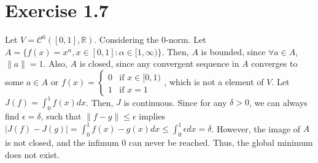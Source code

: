 \documentclass[11pt]{report}
\begin{document}
\section*{Exercise 1.7}
Let $V = \mathcal{C}^0([0,1],\mathbb{R})$. Considering the $0$-norm. Let $A = \{f(x) = x^\alpha, x \in [0,1]: \alpha \in [1, \infty)\}$. Then, $A$ is bounded, since $\forall a \in A$, $\|a\| = 1$. Also, $A$ is closed, since any convergent sequence in $A$ converges to some $a \in A$ or $f(x) = \begin{cases}0 &\mbox{if } x \in [0,1)\\ 1 &\mbox{if } x = 1\end{cases}$, which is not a element of $V$. Let $J(f) = \int_{0}^{1} f(x)dx$. Then, $J$ is continuous. Since for any $\delta > 0$, we can always find $\epsilon = \delta$, such that $\|f-g\| \leq \epsilon$ implies $|J(f) - J(g)| = \int_{0}^{1} f(x) - g(x) dx \leq \int_{0}^{1} \epsilon dx = \delta$. However, the image of $A$ is not closed, and the infimum $0$ can never be reached. Thus, the global minimum does not exist.




\end{document}

